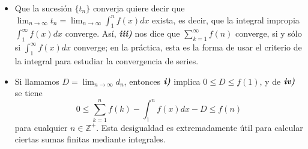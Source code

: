 \begin{remark}
  \begin{itemize}
    \item[\tiny{\ding{110}}] Que la sucesión $\lbrace{t_n\rbrace}$ converja quiere decir que $\lim_{n\to\infty}t_n=\lim_{n\to\infty}\int_1^{n}f(x)dx$ exista, es decir, que la integral impropia $\int_1^{\infty}f(x)dx$ converge. Así, \textit{\textbf{iii)}} nos dice que $\sum_{k=1}^{\infty}f(n)$ converge, si y sólo si $\int_1^{\infty}f(x)dx$ converge; en la práctica, esta es la forma de usar el criterio de la integral para estudiar la convergencia de series.
    \item[\tiny{\ding{110}}] Si llamamos $D=\lim_{n\to\infty}d_n$, entonces $\textit{\textbf{i)}}$ implica $0\leq D\leq f(1)$, y de $\textit{\textbf{iv)}}$ se tiene
    \begin{equation}
    \label{eqn:obs_crit_int}
      0\leq\sum_{k=1}^n f(k)-\int_1^{n}f(x)dx-D\leq f(n)
    \end{equation}
    para cualquier $n\in\mathbb{Z}^+$. Esta desigualdad es extremadamente útil para calcular ciertas sumas finitas mediante integrales.
  \end{itemize}
\end{remark}
